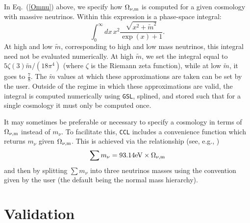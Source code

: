 \documentclass[\docopts]{\docclass}
\newcommand{\ccl}{{\tt CCL}\xspace}
\begin{document}
In Eq.~(\ref{Omnu}) above, we specify how $\Omega_{\nu, {\rm m}}$ is computed for a given cosmology with massive neutrinos. Within this expression is a phase-space integral:
\begin{equation}
\int_0^{\infty} dx \, x^2 \frac{\sqrt{x^2 + \tilde{m}^2}}{\exp(x) + 1}.
\label{phasespacenu}
\end{equation}
At high and low $\tilde{m}$, corresponding to high and low mass neutrinos, this integral need not be evaluated numerically. At high $\tilde{m}$, we set the integral equal to $5\zeta(3)\tilde{m}/(18\pi^4)$ (where $\zeta$ is the Riemann zeta function), while at low $\tilde{m}$, it goes to $\frac{7}{8}$. The $\tilde{m}$ values at which these approximations are taken can be set by the user. Outside of the regime in which these approximations are valid, the integral is computed numerically using {\tt GSL}, splined, and stored such that for a single cosmology it must only be computed once.

It may sometimes be preferable or necessary to specify a cosmology in terms of $\Omega_{\nu, {\rm m}}$ instead of $m_\nu$. To facilitate this, \ccl includes a convenience function which returns $m_\nu$ given $\Omega_{\nu, {\rm m}}$. This is achieved via the relationship (see, e.g., \citealt{Lesgourgues2012})
\begin{equation}
\sum m_\nu = 93.14 {\rm eV} \times \Omega_{\nu, {\rm m}}
\label{summnu_om}
\end{equation}
and then by splitting $\sum m_\nu$ into three neutrinos masses using the convention given by the user (the default being the normal mass hierarchy).


\section{Validation}
\label{sec:validation}
\end{document}
